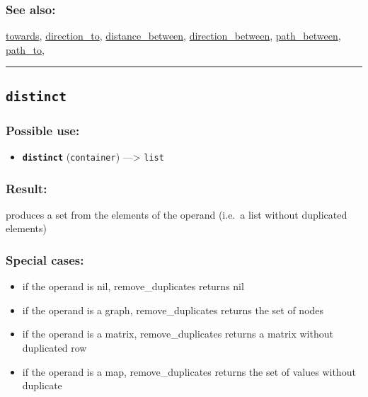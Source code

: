 \documentclass[]{book}
\providecommand{\tightlist}{%
  \setlength{\itemsep}{0pt}\setlength{\parskip}{0pt}}
\theoremstyle{definition}
\theoremstyle{definition}
\theoremstyle{definition}
\theoremstyle{remark}
\begin{document}
\subsubsection{See also:}\label{see-also-81}

\href{OperatorsSZ\#towards}{towards},
\href{OperatorsDH\#direction_to}{direction\_to},
\href{OperatorsDH\#distance_between}{distance\_between},
\href{OperatorsDH\#direction_between}{direction\_between},
\href{OperatorsNR\#path_between}{path\_between},
\href{OperatorsNR\#path_to}{path\_to},

\begin{center}\rule{0.5\linewidth}{\linethickness}\end{center}

\subsection{\texorpdfstring{\texttt{distinct}}{distinct}}\label{distinct}

\subsubsection{Possible use:}\label{possible-use-137}

\begin{itemize}
\tightlist
\item
  \textbf{\texttt{distinct}} (\texttt{container}) ---\textgreater{}
  \texttt{list}
\end{itemize}

\subsubsection{Result:}\label{result-133}

produces a set from the elements of the operand (i.e.~a list without
duplicated elements)

\subsubsection{Special cases:}\label{special-cases-51}

\begin{itemize}
\tightlist
\item
  if the operand is nil, remove\_duplicates returns nil\\
\item
  if the operand is a graph, remove\_duplicates returns the set of
  nodes\\
\item
  if the operand is a matrix, remove\_duplicates returns a matrix
  without duplicated row\\
\item
  if the operand is a map, remove\_duplicates returns the set of values
  without duplicate
\end{itemize}
\end{document}
